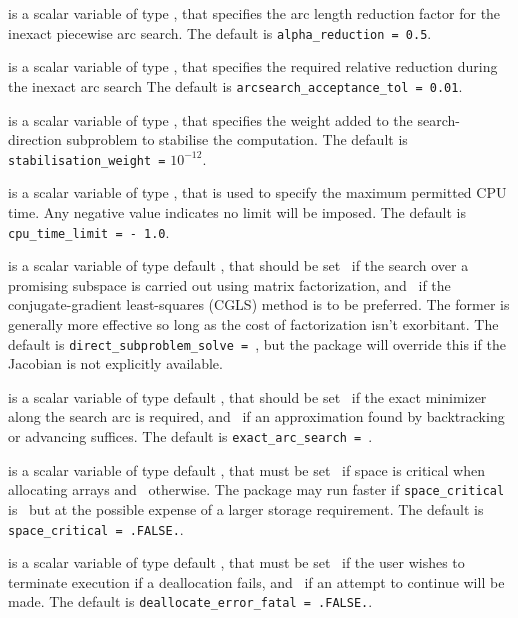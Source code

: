 \documentclass{galahad}
\begin{document}
\begin{description}
 is a scalar variable of type \realdp, that
specifies the arc length reduction factor for the inexact piecewise arc search.
The default is {\tt alpha\_reduction = 0.5}.

 is a scalar variable of type \realdp,
that specifies the required relative reduction during the inexact arc search
The default is {\tt arcsearch\_acceptance\_tol = 0.01}.

 is a scalar variable of type \realdp,
that specifies the weight added to the search-direction subproblem to 
stabilise the computation.
The default is {\tt stabilisation\_weight =} $10^{-12}$.

 is a scalar variable of type \realdp,
that is used to specify the maximum permitted CPU time. Any negative
value indicates no limit will be imposed. The default is
{\tt cpu\_time\_limit = - 1.0}.

 is a scalar variable of type default \logical,
that should be set \true\ if the search over a promising subspace is
carried out using matrix factorization, and \false\ if the conjugate-gradient
least-squares (CGLS) method is to be preferred. The former is generally
more effective so long as the cost of factorization isn't exorbitant.
The default is {\tt direct\_subproblem\_solve = \true}, but the
package will override this if the Jacobian is not explicitly available.

 is a scalar variable of type default \logical,
that should be set \true\ if the exact minimizer along the search arc is
required, and \false\ if an approximation found by backtracking or
advancing suffices.
The default is {\tt exact\_arc\_search = \true}.


 is a scalar variable of type default \logical,
that must be set \true\ if space is critical when allocating arrays
and  \false\ otherwise. The package may run faster if
{\tt space\_critical} is \false\ but at the possible expense of a larger
storage requirement. The default is {\tt space\_critical = .FALSE.}.

 is a scalar variable of type default \logical,
that must be set \true\ if the user wishes to terminate execution if
a deallocation  fails, and \false\ if an attempt to continue
will be made. The default is {\tt deallocate\_error\_fatal = .FALSE.}.


\end{description}
\end{document}
